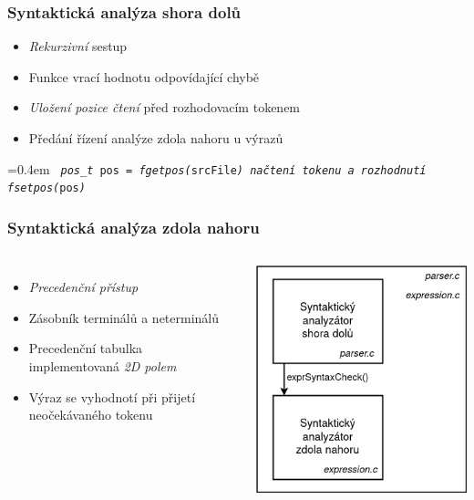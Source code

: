 \begin{frame}
  \frametitle{Syntaktická analýza shora dolů}
        \begin{itemize}
        \setlength\itemsep{1em}
            \item \emph{Rekurzivní} sestup
            \item Funkce vrací hodnotu odpovídající chybě
            \item \emph{Uložení pozice čtení} před rozhodovacím tokenem
            \item Předání řízení analýze zdola nahoru u výrazů
        \end{itemize}
    
    \vspace{1.5em}
    
        \begin{flushleft}
        \font=0.4em
        \texttt{
        \emph{pos\_t} pos = \emph{fgetpos(}srcFile\emph{)}\newline\newline
        \textit{načtení tokenu a rozhodnutí}\newline\newline
        \emph{fsetpos(}pos\emph{)}}
        \end{flushleft}
\end{frame}



\begin{frame}\frametitle{Syntaktická analýza zdola nahoru}
  \begin{columns}
    \begin{itemize}
    \setlength\itemsep{1em}
        \item \emph{Precedenční přístup}
        \item Zásobník terminálů a neterminálů
        \item Precedenční tabulka implementovaná \emph{2D polem}
        \item Výraz se vyhodnotí při přijetí neočekávaného tokenu
    \end{itemize}
    
    
    \centering
    \includegraphics[scale=0.34,keepaspectratio]{img/DiagramSynt1.png}
    \end{columns}
\end{frame}



